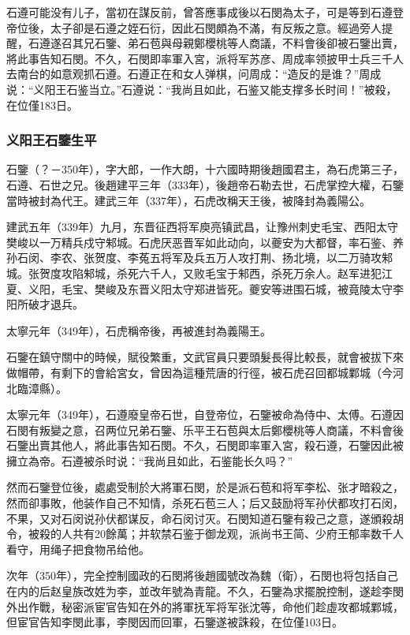 石遵可能没有儿子，當初在謀反前，曾答應事成後以石閔為太子，可是等到石遵登帝位後，太子卻是石遵之姪石衍，因此石閔頗為不滿，有反叛之意。經過旁人提醒，石遵遂召其兄石鑒、弟石苞與母親鄭櫻桃等人商議，不料會後卻被石鑒出賣，將此事告知石閔。不久，石閔即率軍入宮，派将军苏彦、周成率领披甲士兵三千人去南台的如意观抓石遵。石遵正在和女人弹棋，问周成：“造反的是谁？”周成说：“义阳王石鉴当立。”石遵说：“我尚且如此，石鉴又能支撑多长时间！”被殺，在位僅183日。

\subsubsection{义阳王石鑒生平}

石鑒（？－350年），字大郎，一作大朗，十六國時期後趙國君主，為石虎第三子，石遵、石世之兄。後趙建平三年（333年），後趙帝石勒去世，石虎掌控大權，石鑒當時被封為代王。建武三年（337年），石虎改稱天王後，被降封為義陽公。

建武五年（339年）九月，东晋征西将军庾亮镇武昌，让豫州刺史毛宝、西阳太守樊峻以一万精兵戍守邾城。石虎厌恶晋军如此动向，以夔安为大都督，率石鉴、养孙石闵、李农、张贺度、李菟五将军及兵五万人攻打荆、扬北境，以二万骑攻邾城。张贺度攻陷邾城，杀死六千人，又败毛宝于邾西，杀死万余人。赵军进犯江夏、义阳，毛宝、樊峻及东晋义阳太守郑进皆死。夔安等进围石城，被竟陵太守李阳所破才退兵。

太寧元年（349年），石虎稱帝後，再被進封為義陽王。

石鑒在鎮守關中的時候，賦役繁重，文武官員只要頭髮長得比較長，就會被拔下來做帽帶，有剩下的會給宮女，曾因為這種荒唐的行徑，被石虎召回都城鄴城（今河北臨漳縣）。

太寧元年（349年），石遵廢皇帝石世，自登帝位，石鑒被命為侍中、太傅。石遵因石閔有叛變之意，召两位兄弟石鑒、乐平王石苞與太后鄭櫻桃等人商議，不料會後石鑒出賣其他人，將此事告知石閔。不久，石閔即率軍入宮，殺石遵，石鑒因此被擁立為帝。石遵被杀时说：“我尚且如此，石鉴能长久吗？”

然而石鑒登位後，處處受制於大將軍石閔，於是派石苞和将军李松、张才暗殺之，然而卻事敗，他装作自己不知情，杀死石苞三人；后又鼓励将军孙伏都攻打石闵，不果，又对石闵说孙伏都谋反，命石闵讨灭。石閔知道石鑒有殺己之意，遂頒殺胡令，被殺的人共有20餘萬；并软禁石鉴于御龙观，派尚书王简、少府王郁率数千人看守，用绳子把食物吊给他。

次年（350年），完全控制國政的石閔將後趙國號改為魏（衛），石閔也将包括自己在内的后赵皇族改姓为李，並改年號為青龍。不久，石鑒為求擺脫控制，遂趁李閔外出作戰，秘密派宦官告知在外的將軍抚军将军张沈等，命他们趁虛攻都城鄴城，但宦官告知李閔此事，李閔因而回軍，石鑒遂被誅殺，在位僅103日。

